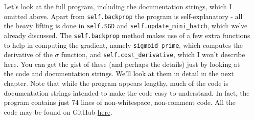 Let's look at the full program, including the documentation strings, which I omitted above. Apart from \texttt{self.backprop} the program is self-explanatory - all the heavy lifting is done in \texttt{self.SGD} and \texttt{self.update\_mini\_batch}, which we've already discussed. The \texttt{self.backprop} method makes use of a few extra functions to help in computing the gradient, namely \texttt{sigmoid\_prime}, which computes the derivative of the $\sigma$ function, and \texttt{self.cost\_derivative}, which I won't describe here. You can get the gist of these (and perhaps the details) just by looking at the code and documentation strings. We'll look at them in detail in the next chapter. Note that while the program appears lengthy, much of the code is documentation strings intended to make the code easy to understand. In fact, the program contains just 74 lines of non-whitespace, non-comment code. All the code may be found on GitHub \href{https://github.com/mnielsen/neural-networks-and-deep-learning/blob/master/src/network.py}{here}.

